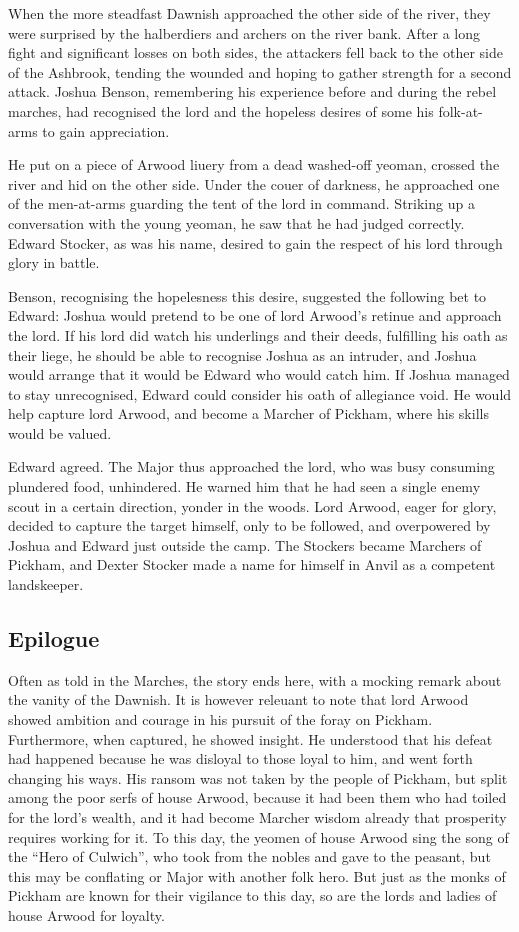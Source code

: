 When the more steadfast Dawnish
approached the other side of the river,
they were surprised by the
halberdiers and archers on the river
bank. After a long fight and
significant losses on both sides, the
attackers fell back to the other side of
 the Ashbrook, tending the wounded
and hoping to gather strength for a
 second attack. Joshua Benson,
remembering his experience before
and during the rebel marches, had
recognised the lord and the hopeless
desires of some his
folk-at-arms to gain
appreciation.

He
put on a piece of
Arwood liuery from a
dead washed-off
yeoman, crossed the
river and hid on the
other side. Under the
couer of darkness, he
approached one of the
men-at-arms guarding the tent of
the lord in command. Striking up a
conversation with the young
yeoman, he saw that he had judged
correctly. Edward Stocker, as was
his name, desired to gain the respect
of his lord through glory in battle.

Benson, recognising the hopelesness
this desire, suggested the following
bet to Edward: Joshua would pretend
to be one of lord Arwood’s retinue
and approach the lord. If his lord did
watch his underlings and their deeds,
fulfilling his oath as their liege, he
should be able to recognise Joshua as
an intruder, and Joshua would
arrange that it would be Edward
who would catch him. If Joshua
managed to stay unrecognised,
Edward could consider his oath of
allegiance void. He would help
capture lord Arwood, and become a
Marcher of Pickham, where his
skills would be valued.

Edward
agreed. The Major thus
approached the lord, who was busy
consuming plundered food,
unhindered. He warned him that he
had seen a single enemy scout in a
certain direction, yonder in the
woods. Lord Arwood, eager for glory,
decided to capture the target himself,
only to be followed, and
overpowered by Joshua and Edward
just outside the camp. The Stockers became Marchers of Pickham, and Dexter Stocker made a name for himself in Anvil as a competent landskeeper.

\subsection{Epilogue}
Often as told in the
Marches, the story ends
here, with a mocking
remark about the vanity of the
Dawnish. It is however
releuant to note that lord Arwood
showed ambition and courage in his
pursuit of the foray on Pickham.
Furthermore, when captured, he
showed insight. He understood that
his defeat had happened because he
was disloyal to those loyal to him,
and went forth changing his ways.
His ransom was not taken by the
people of Pickham, but split among
the poor serfs of house Arwood,
because it had been them who had
toiled for the lord's wealth, and it
had become Marcher wisdom already
that prosperity requires working for
it. To this day, the yeomen of house Arwood
sing the song of the “Hero of
Culwich”, who took from the nobles
and gave to the peasant, but this
may be conflating or Major with
another folk hero. But just as the
monks of Pickham are known for
their vigilance to this day, so are the
lords and ladies of house Arwood for
loyalty.
